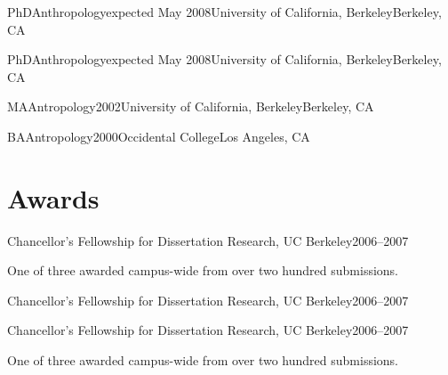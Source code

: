 \documentclass[10pt,letterpaper,lmodern]{mtvita}
\begin{document}
\begin{degree}{PhD}{Anthropology}{expected May 2008}{University of California, Berkeley}{Berkeley, CA}
\degreeindent
\degreeindent\lipsum[1]
\end{degree}

\begin{degree}{PhD}{Anthropology}{expected May 2008}{University of California, Berkeley}{Berkeley, CA}
\end{degree}

\begin{degree}{MA}{Antropology}{2002}{University of California, Berkeley}{Berkeley, CA}\end{degree}

\begin{degree*}{BA}{Antropology}{2000}{Occidental College}{Los Angeles, CA}\end{degree*}

\section{Awards}
\begin{award}{Chancellor's Fellowship for Dissertation Research, UC Berkeley}{2006--2007}%
\par\noindent One of three awarded campus-wide from over two hundred submissions.
\end{award}

\begin{award}{Chancellor's Fellowship for Dissertation Research, UC Berkeley}{2006--2007}%
\end{award}

\begin{award}{Chancellor's Fellowship for Dissertation Research, UC Berkeley}{2006--2007}%
\par\noindent One of three awarded campus-wide from over two hundred submissions.
\end{award}
\end{document}
